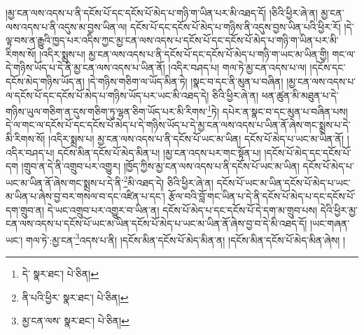 །མྱ་ངན་ལས་འདས་པ་ནི་དངོས་པོ་དང་དངོས་པོ་མེད་པ་གཉི་ག་ཡིན་པར་མི་འཐད་དོ། །ཅིའི་ཕྱིར་ཞེ་ན། མྱ་ངན་ལས་འདས་པ་ནི་འདུས་མ་བྱས་ཡིན་ལ། དངོས་པོ་དང་དངོས་པོ་མེད་པ་གཉིས་ནི་འདུས་བྱས་ཡིན་པའི་ཕྱིར་རོ། །དེ་ལྟ་བས་ན་རྒྱུའི་ཁྱད་པར་འདིས་ཀྱང་མྱ་ངན་ལས་འདས་པ་དངོས་པོ་དང་དངོས་པོ་མེད་པ་གཉི་ག་ཡིན་པར་མི་རིགས་སོ། །འདིར་སྨྲས་པ། མྱ་ངན་ལས་འདས་པ་ནི་དངོས་པོ་དང་དངོས་པོ་མེད་པ་གཉི་ག་ཡང་མ་ཡིན་གྱི། གང་ལ་དེ་གཉིས་ཡོད་པ་དེ་ནི་མྱ་ངན་ལས་འདས་པ་ཡིན་ནོ། །འདིར་བཤད་པ། གལ་ཏེ་མྱ་ངན་འདས་པ་ལ། །དངོས་དང་དངོས་མེད་གཉིས་ཡོད་ན། །དེ་གཉིས་གཅིག་ལ་ཡོད་མིན་ཏེ། །སྣང་བ་དང་ནི་མུན་པ་བཞིན། །མྱ་ངན་ལས་འདས་པ་ལ་དངོས་པོ་དང་དངོས་པོ་མེད་པ་གཉིས་ཡོད་པར་ཡང་མི་འཐད་དེ། ཅིའི་ཕྱིར་ཞེ་ན། ཕན་ཚུན་མི་མཐུན་པ་དེ་གཉིས་ཡུལ་གཅིག་ན་དུས་གཅིག་ཏུ་ལྷན་ཅིག་ཡོད་པར་མི་རིགས་\footnote{དེ་  སྣར་ཐང་།  པེ་ཅིན། }ཏེ། དཔེར་ན་སྣང་བ་དང་མུན་པ་བཞིན་པས། དེ་ལ་གང་ལ་དངོས་པོ་དང་དངོས་པོ་མེད་པ་དེ་གཉིས་ཡོད་པ་དེ་མྱ་ངན་ལས་འདས་པ་ཡིན་ནོ་ཞེས་གང་སྨྲས་པ་དེ་མི་རིགས་སོ། །འདིར་སྨྲས་པ། མྱ་ངན་ལས་འདས་པ་ནི་དངོས་པོ་ཡང་མ་ཡིན། དངོས་པོ་མེད་པ་ཡང་མ་ཡིན་ནོ། །འདིར་བཤད་པ། དངོས་མིན་དངོས་པོ་མེད་མིན་པ། །མྱ་ངན་འདས་པར་གང་སྟོན་པ། །དངོས་པོ་མེད་དང་དངོས་པོ་དག །གྲུབ་ན་དེ་ནི་འགྲུབ་པར་འགྱུར། །ཁྱོད་ཀྱིས་མྱ་ངན་ལས་འདས་པ་ནི་དངོས་པོ་ཡང་མ་ཡིན། དངོས་པོ་མེད་པ་ཡང་མ་ཡིན་ནོ་ཞེས་གང་སྨྲས་པ་དེ་ནི་\footnote{ནི་པའི་ཕྱིར་  སྣར་ཐང་།  པེ་ཅིན། }མི་འཐད་དེ། ཅིའི་ཕྱིར་ཞེ་ན། དངོས་པོ་ཡང་མ་ཡིན་དངོས་པོ་མེད་པ་ཡང་མ་ཡིན་པ་ཞེས་བྱ་བར་གསལ་བ་དང་འཛིན་པ་དང་། རྩོལ་བའི་བློ་གང་ཡིན་པ་དེ་ནི་དངོས་པོ་མེད་པ་དང་དངོས་པོ་དག་གྲུབ་ན། དེ་ཡང་འགྲུབ་པར་འགྱུར་བ་ཡིན་ན། དངོས་པོ་མེད་པ་དང་དངོས་པོ་དེ་དག་མ་གྲུབ་པས། དེའི་ཕྱིར་མྱ་ངན་ལས་འདས་པ་དངོས་པོ་ཡང་མ་ཡིན་དངོས་པོ་མེད་པ་ཡང་མ་ཡིན་ནོ་ཞེས་བྱ་བ་དེ་མི་འཐད་དོ། །ཡང་གཞན་ཡང་། གལ་ཏེ་:མྱ་ངན་\footnote{མྱ་ངན་ལས་  སྣར་ཐང་།  པེ་ཅིན། }འདས་པ་ནི། །དངོས་མིན་དངོས་པོ་མེད་མིན་ན། །དངོས་མིན་དངོས་པོ་མེད་མིན་ཞེས། །
